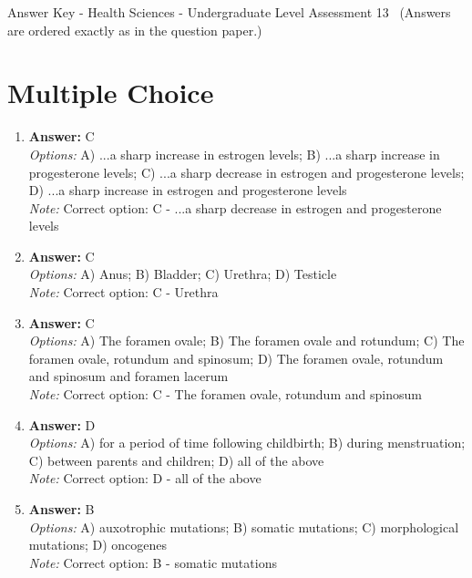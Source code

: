 \documentclass[12pt]{article}
\begin{document}
\begin{center}
Answer Key - Health Sciences - Undergraduate Level Assessment 13 \
\small (Answers are ordered exactly as in the question paper.)
\end{center}

\section*{Multiple Choice}
\begin{enumerate}[label=\arabic*.]
\item \textbf{Answer:} C
\\ \textit{Options:} A) ...a sharp increase in estrogen levels; B) ...a sharp increase in progesterone levels; C) ...a sharp decrease in estrogen and progesterone levels; D) ...a sharp increase in estrogen and progesterone levels
\\ \textit{Note:} Correct option: C - ...a sharp decrease in estrogen and progesterone levels
\item \textbf{Answer:} C
\\ \textit{Options:} A) Anus; B) Bladder; C) Urethra; D) Testicle
\\ \textit{Note:} Correct option: C - Urethra
\item \textbf{Answer:} C
\\ \textit{Options:} A) The foramen ovale; B) The foramen ovale and rotundum; C) The foramen ovale, rotundum and spinosum; D) The foramen ovale, rotundum and spinosum and foramen lacerum
\\ \textit{Note:} Correct option: C - The foramen ovale, rotundum and spinosum
\item \textbf{Answer:} D
\\ \textit{Options:} A) for a period of time following childbirth; B) during menstruation; C) between parents and children; D) all of the above
\\ \textit{Note:} Correct option: D - all of the above
\item \textbf{Answer:} B
\\ \textit{Options:} A) auxotrophic mutations; B) somatic mutations; C) morphological mutations; D) oncogenes
\\ \textit{Note:} Correct option: B - somatic mutations
\end{enumerate}
\end{document}
